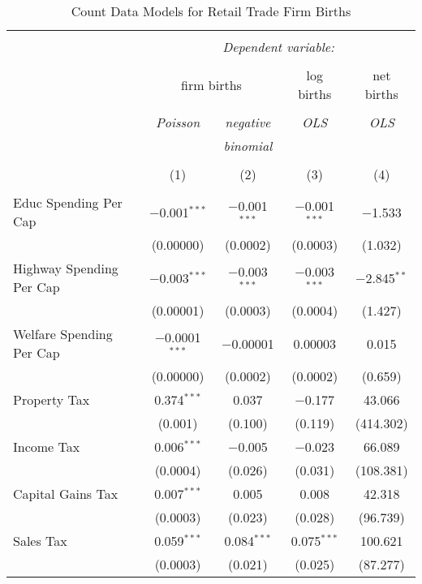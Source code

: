 
\begin{table}[!htbp] \centering 
  \caption{Count Data Models for Retail Trade Firm Births} 
  \label{} 
\begin{tabular}{@{\extracolsep{5pt}}lcccc} 
\\[-1.8ex]\hline 
\hline \\[-1.8ex] 
 & \multicolumn{4}{c}{\textit{Dependent variable:}} \\ 
\cline{2-5} 
\\[-1.8ex] & \multicolumn{2}{c}{firm births} & log births & net births \\ 
\\[-1.8ex] & \textit{Poisson} & \textit{negative} & \textit{OLS} & \textit{OLS} \\ 
 & \textit{} & \textit{binomial} & \textit{} & \textit{} \\ 
\\[-1.8ex] & (1) & (2) & (3) & (4)\\ 
\hline \\[-1.8ex] 
 Educ Spending Per Cap & $-$0.001$^{***}$ & $-$0.001$^{***}$ & $-$0.001$^{***}$ & $-$1.533 \\ 
  & (0.00000) & (0.0002) & (0.0003) & (1.032) \\ 
  Highway Spending Per Cap  & $-$0.003$^{***}$ & $-$0.003$^{***}$ & $-$0.003$^{***}$ & $-$2.845$^{**}$ \\ 
  & (0.00001) & (0.0003) & (0.0004) & (1.427) \\ 
  Welfare Spending Per Cap  & $-$0.0001$^{***}$ & $-$0.00001 & 0.00003 & 0.015 \\ 
  & (0.00000) & (0.0002) & (0.0002) & (0.659) \\ 
  Property Tax & 0.374$^{***}$ & 0.037 & $-$0.177 & 43.066 \\ 
  & (0.001) & (0.100) & (0.119) & (414.302) \\ 
  Income Tax & 0.006$^{***}$ & $-$0.005 & $-$0.023 & 66.089 \\ 
  & (0.0004) & (0.026) & (0.031) & (108.381) \\ 
  Capital Gains Tax & 0.007$^{***}$ & 0.005 & 0.008 & 42.318 \\ 
  & (0.0003) & (0.023) & (0.028) & (96.739) \\ 
  Sales Tax & 0.059$^{***}$ & 0.084$^{***}$ & 0.075$^{***}$ & 100.621 \\ 
  & (0.0003) & (0.021) & (0.025) & (87.277) \\ 

\end{tabular}
\end{table}
